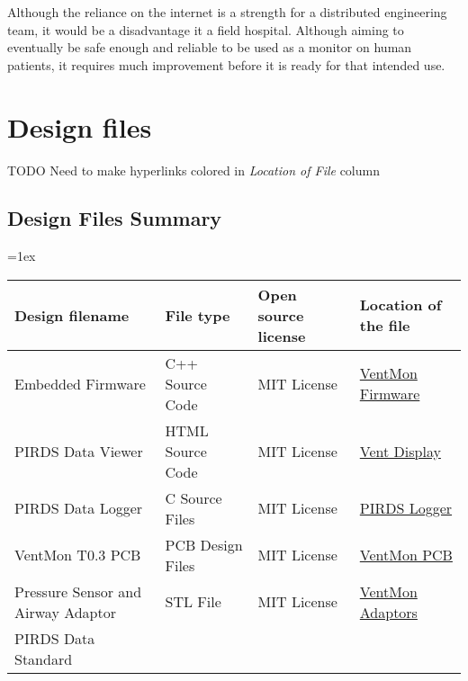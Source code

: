 \documentclass[11pt, letterpaper]{article}
\begin{document}
Although the reliance on the internet is a strength for a distributed engineering team, it would be a disadvantage
it a field hospital. Although aiming to eventually be safe enough and reliable to be used as a monitor
on human patients, it requires much improvement before it is ready for that intended use.

\section{Design files}

TODO Need to make hyperlinks colored in \textit{Location of File} column

\subsection{Design Files Summary}

\tabulinesep=1ex
\begin{tabu} to \linewidth {|X|X|X[1.5,1]|X[1.5,1]|}
\hline
\textbf{Design filename} & \textbf{File type} & \textbf{Open source license} & \textbf{Location of the file} \\\hline
Embedded Firmware & C++ Source Code & MIT License &  \href{https://github.com/PubInv/ventmon-ventilator-inline-test-monitor/tree/master/VentMonFirmware}{VentMon Firmware}\\\hline
PIRDS Data Viewer & HTML Source Code &  MIT License &  \href{https://github.com/PubInv/vent-display}{Vent Display} \\\hline
PIRDS Data Logger & C Source Files & MIT License & \href{https://github.com/PubInv/PIRDS-logger}{PIRDS Logger} \\\hline
VentMon T0.3 PCB & PCB Design Files & MIT License & \href{https://github.com/PubInv/ventmon-ventilator-inline-test-monitor/tree/master/design/pcb}{VentMon PCB} \\\hline
Pressure Sensor and Airway Adaptor & STL File & MIT License &  \href{https://github.com/PubInv/ventmon-ventilator-inline-test-monitor/tree/master/design/3dparts}{VentMon Adaptors}\\\hline
PIRDS Data Standard & \\\hline


\end{tabu}
\end{document}
